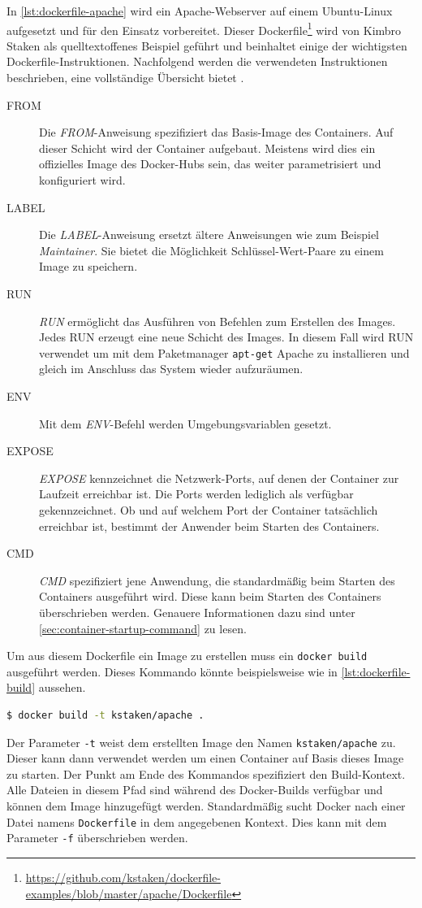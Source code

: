
In \cref{lst:dockerfile-apache} wird ein Apache-Webserver auf einem Ubuntu-Linux aufgesetzt und für den Einsatz vorbereitet.
Dieser Dockerfile\footnote{\url{https://github.com/kstaken/dockerfile-examples/blob/master/apache/Dockerfile}} wird von Kimbro Staken als quelltextoffenes Beispiel geführt und beinhaltet einige der wichtigsten Dockerfile-Instruktionen.
Nachfolgend werden die verwendeten Instruktionen beschrieben, eine vollständige Übersicht bietet \autocite{docker-dockerfile:online}.
\begin{description}
    \item[FROM] Die \emph{FROM}-Anweisung spezifiziert das Basis-Image des Containers. Auf dieser Schicht wird der Container aufgebaut. Meistens wird dies ein offizielles Image des Docker-Hubs sein, das weiter parametrisiert und konfiguriert wird.
    \item[LABEL] Die \emph{LABEL}-Anweisung ersetzt ältere Anweisungen wie zum Beispiel \emph{Maintainer}. Sie bietet die Möglichkeit Schlüssel-Wert-Paare zu einem Image zu speichern.
    \item[RUN] \emph{RUN} ermöglicht das Ausführen von Befehlen zum Erstellen des Images. Jedes RUN erzeugt eine neue Schicht des Images. In diesem Fall wird RUN verwendet um mit dem Paketmanager \texttt{apt-get} Apache zu installieren und gleich im Anschluss das System wieder aufzuräumen.
    \item[ENV] Mit dem \emph{ENV}-Befehl werden Umgebungsvariablen gesetzt.
    \item[EXPOSE] \emph{EXPOSE} kennzeichnet die Netzwerk-Ports, auf denen der Container zur Laufzeit erreichbar ist. Die Ports werden lediglich als verfügbar gekennzeichnet. Ob und auf welchem Port der Container tatsächlich erreichbar ist, bestimmt der Anwender beim Starten des Containers.
    \item[CMD] \emph{CMD} spezifiziert jene Anwendung, die standardmäßig beim Starten des Containers ausgeführt wird. Diese kann beim Starten des Containers überschrieben werden. Genauere Informationen dazu sind unter \cref{sec:container-startup-command} zu lesen.
\end{description}

Um aus diesem Dockerfile ein Image zu erstellen muss ein \texttt{docker build} ausgeführt werden.
Dieses Kommando könnte beispielsweise wie in \cref{lst:dockerfile-build} aussehen.

\begin{lstlisting}[caption=Erstellen eines Images auf Basis eines Dockerfiles, language=bash, label=lst:dockerfile-build]
$ docker build -t kstaken/apache .
\end{lstlisting}
Der Parameter \texttt{-t} weist dem erstellten Image den Namen \texttt{kstaken/apache} zu.
Dieser kann dann verwendet werden um einen Container auf Basis dieses Image zu starten.
Der Punkt am Ende des Kommandos spezifiziert den Build-Kontext.
Alle Dateien in diesem Pfad sind während des Docker-Builds verfügbar und können dem Image hinzugefügt werden.
Standardmäßig sucht Docker nach einer Datei namens \texttt{Dockerfile} in dem angegebenen Kontext.
Dies kann mit dem Parameter \texttt{-f} überschrieben werden.


